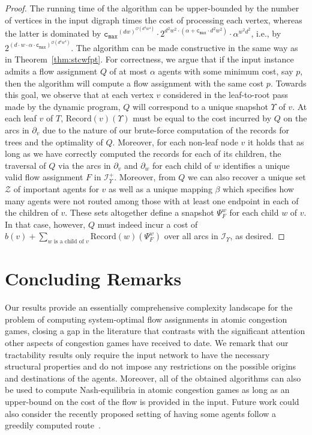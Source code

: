 \documentclass[letterpaper]{article} %
\newcommand{\bigoh}{\ensuremath{{\mathcal O}}}
\newcommand{\cmax}{\mathtt{c_{max}}}
\newcommand{\Rec}{\text{Record}}
\newcommand{\Imp}{\mathcal{Z}}
\begin{document}
\begin{proof}
The running time of the algorithm can be upper-bounded by the number of vertices in the input digraph times the cost of processing each vertex, whereas the latter is dominated by $\cmax^{(dw)^{\bigoh(d^4w^4)}}\cdot 2^{d^2w^2\cdot (\alpha+\cmax\cdot d^2w^2)} \cdot \alpha^{w^2d^2}$, i.e., by $2^{(d\cdot w\cdot \alpha\cdot \cmax)^{\bigoh(d^4w^4)}}$. The algorithm can be made constructive in the same way as in Theorem~\ref{thm:stcwfpt}. For correctness, we argue that if the input instance admits a flow assignment $Q$ of at most $\alpha$ agents with some minimum cost, say $p$, then the algorithm will compute a flow assignment with the same cost $p$. Towards this goal, we observe that at each vertex $v$ considered in the leaf-to-root pass made by the dynamic program, $Q$ will correspond to a unique snapshot $\Upsilon$ of $v$. At each leaf $v$ of $T$, $\Rec(v)(\Upsilon)$ must be equal to the cost incurred by $Q$ on the arcs in $\partial_v$ due to the nature of our brute-force computation of the records for trees and the optimality of $Q$. Moreover, for each non-leaf node $v$ it holds that as long as we have correctly computed the records for each of its children, the traversal of $Q$ via the arcs in $\partial_v$ and $\partial_w$ for each child of $w$ identifies a unique valid flow assignment $F$ in $\mathcal{I}^+_\Upsilon$. Moreover, from $Q$ we can also recover a unique set $\Imp$ of important agents for $v$ as well as a unique mapping $\beta$ which specifies how many agents were not routed among those with at least one endpoint in each of the children of $v$. These sets altogether define a snapshot $\Psi^w_F$ for each child $w$ of $v$. In that case, however, $Q$ must indeed incur a cost of $b(v)+\sum_{w\text{ is a child of }v}\Rec(w)(\Psi^w_F)$ over all arcs in $\mathcal{I}_\Upsilon$, as desired.
\end{proof}

\section{Concluding Remarks}
Our results provide an essentially comprehensive complexity landscape for the problem of computing system-optimal flow assignments in atomic congestion games, closing a gap in the literature that contrasts with the significant attention other aspects of congestion games have received to date. We remark that our tractability results only require the input network to have the necessary structural properties and do not impose any restrictions on the possible origins and destinations of the agents. Moreover, all of the obtained algorithms can also be used to compute Nash-equilibria in atomic congestion games as long as an upper-bound on the cost of the flow is provided in the input. Future work could also consider the recently proposed setting of having some agents follow a greedily computed route~\cite{SharonARBS18}.
\end{document}
